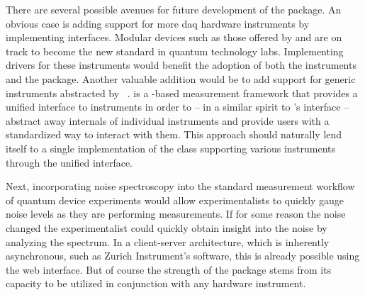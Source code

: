 There are several possible avenues for future development of the \pyspeck package.
An obvious case is adding support for more \gls{daq} hardware instruments by implementing  interfaces.
Modular devices such as those offered by  and  are on track to become the new standard in quantum technology labs.
Implementing drivers for these instruments would benefit the adoption of both the instruments and the \pyspeck package.
Another valuable addition would be to add support for generic instruments abstracted by \qumada~\cite{Huckemann2025a}.
\qumada is a \qcodes-based measurement framework that provides a unified interface to instruments in order to -- in a similar spirit to \pyspeck's  interface -- abstract away internals of individual instruments and provide users with a standardized way to interact with them.
This approach should naturally lend itself to a single implementation of the  class supporting various instruments through the unified \qumada interface.

Next, incorporating noise spectroscopy into the standard measurement workflow of quantum device experiments would allow experimentalists to quickly gauge noise levels as they are performing measurements.
If for some reason the noise changed
the experimentalist could quickly obtain insight into the noise by analyzing the spectrum.
In a client-server architecture, which is inherently asynchronous, such as Zurich Instrument's  software, this is already possible using the web interface.
But of course the strength of the \pyspeck package stems from its capacity to be utilized in conjunction with any hardware instrument.

